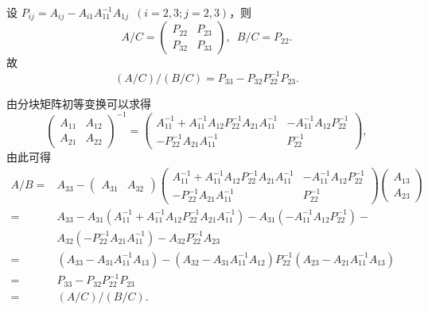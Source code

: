 \documentclass[UTF8,12pt,a4paper,fontset=fandol]{ctexart}
\begin{document}
\begin{solve}
                设 $P_{ij} = A_{ij} - A_{i1} A_{11}^{-1} A_{1j} \enspace (i=2,3; j=2,3)$，则
                \[
                    A/C = \begin{pmatrix}
                        P_{22} & P_{23} \\
                        P_{32} & P_{33}
                    \end{pmatrix}, \enspace
                    B/C = P_{22}.
                \]
                故
                \[
                    (A/C)/(B/C) = P_{33} - P_{32} P_{22}^{-1} P_{23}.
                \]

                由分块矩阵初等变换可以求得
                \[
                    \begin{pmatrix}
                        A_{11} & A_{12} \\
                        A_{21} & A_{22}
                    \end{pmatrix}^{-1} = \begin{pmatrix}
                        A_{11}^{-1} + A_{11}^{-1} A_{12} P_{22}^{-1} A_{21} A_{11}^{-1} & -A_{11}^{-1} A_{12} P_{22}^{-1} \\
                        -P_{22}^{-1} A_{21} A_{11}^{-1} & P_{22}^{-1}
                    \end{pmatrix},
                \]
                由此可得
                \begin{align*}
                    A/B = {} & A_{33} - \begin{pmatrix}
                        A_{31} & A_{32}
                    \end{pmatrix} \begin{pmatrix}
                        A_{11}^{-1} + A_{11}^{-1} A_{12} P_{22}^{-1} A_{21} A_{11}^{-1} & -A_{11}^{-1} A_{12} P_{22}^{-1} \\
                        -P_{22}^{-1} A_{21} A_{11}^{-1} & P_{22}^{-1}
                    \end{pmatrix} \begin{pmatrix}
                        A_{13} \\ A_{23}
                    \end{pmatrix} \\
                    = {} & A_{33} - A_{31} \left(A_{11}^{-1} + A_{11}^{-1} A_{12} P_{22}^{-1} A_{21} A_{11}^{-1}\right) - A_{31} \left(-A_{11}^{-1} A_{12} P_{22}^{-1}\right) - \\
                      {} & A_{32} \left(-P_{22}^{-1} A_{21} A_{11}^{-1}\right) - A_{32} P_{22}^{-1} A_{23} \\
                    = {} & \left(A_{33} - A_{31} A_{11}^{-1} A_{13}\right) - \left(A_{32} - A_{31} A_{11}^{-1} A_{12}\right) P_{22}^{-1} \left(A_{23} - A_{21} A_{11}^{-1} A_{13}\right) \\
                    = {} & P_{33} - P_{32} P_{22}^{-1} P_{23} \\
                    = {} & (A/C)/(B/C).
                \end{align*}
\end{solve}
\end{document}
